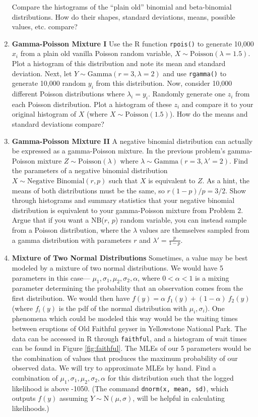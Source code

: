 \documentclass[
]{krantz}
\begin{document}
\begin{enumerate}
  Compare the histograms of the ``plain old'' binomial and beta-binomial distributions. How do their shapes, standard deviations, means, possible values, etc. compare?
\item
  \textbf{Gamma-Poisson Mixture I} Use the R function \texttt{rpois()} to generate 10,000 \(x_i\) from a plain old vanilla Poisson random variable, \(X \sim \textrm{Poisson}(\lambda=1.5)\). Plot a histogram of this distribution and note its mean and standard deviation. Next, let \(Y \sim \textrm{Gamma}(r = 3, \lambda = 2)\) and use \texttt{rgamma()} to generate 10,000 random \(y_i\) from this distribution. Now, consider 10,000 different Poisson distributions where \(\lambda_i = y_i\). Randomly generate one \(z_i\) from each Poisson distribution. Plot a histogram of these \(z_i\) and compare it to your original histogram of \(X\) (where \(X \sim \textrm{Poisson}(1.5)\)). How do the means and standard deviations compare?
\item
  \textbf{Gamma-Poisson Mixture II} A negative binomial distribution can actually be expressed as a gamma-Poisson mixture.
  In the previous problem's gamma-Poisson mixture \(Z \sim \textrm{Poisson}(\lambda)\) where \(\lambda \sim \textrm{Gamma}(r = 3, \lambda' = 2)\).
  Find the parameters of a negative binomial distribution \(X \sim \textrm{Negative Binomial}(r, p)\) such that \(X\) is equivalent to \(Z\). As a hint, the means of both distributions must be the same, so \(r(1-p)/p = 3/2\). Show through histograms and summary statistics that your negative binomial distribution is equivalent to your gamma-Poisson mixture from Problem 2. Argue that if you want a NB(\(r\), \(p\)) random variable, you can instead sample from a Poisson distribution, where the \(\lambda\) values are themselves sampled from a gamma distribution with parameters \(r\) and \(\lambda' = \frac{p}{1-p}\).
\item
  \textbf{Mixture of Two Normal Distributions} Sometimes, a value may be best modeled by a mixture of two normal distributions. We would have 5 parameters in this case--- \(\mu_1, \sigma_1, \mu_2, \sigma_2, \alpha\), where \(0 < \alpha < 1\) is a mixing parameter determining the probability that an observation comes from the first distribution. We would then have \(f(y) = \alpha\ f_1(y) + (1-\alpha)\ f_2(y)\) (where \(f_i(y)\) is the pdf of the normal distribution with \(\mu_i, \sigma_i\)). One phenomena which could be modeled this way would be the waiting times between eruptions of Old Faithful geyser in Yellowstone National Park. The data can be accessed in R through \texttt{faithful}, and a histogram of wait times can be found in Figure \ref{fig:faithful}. The MLEs of our 5 parameters would be the combination of values that produces the maximum probability of our observed data. We will try to approximate MLEs by hand. Find a combination of \(\mu_1, \sigma_1, \mu_2, \sigma_2, \alpha\) for this distribution such that the logged likelihood is above -1050. (The command \texttt{dnorm(x,\ mean,\ sd)}, which outputs \(f(y)\) assuming \(Y \sim \textrm{N}(\mu, \sigma)\), will be helpful in calculating likelihoods.)
\end{enumerate}
\end{document}
